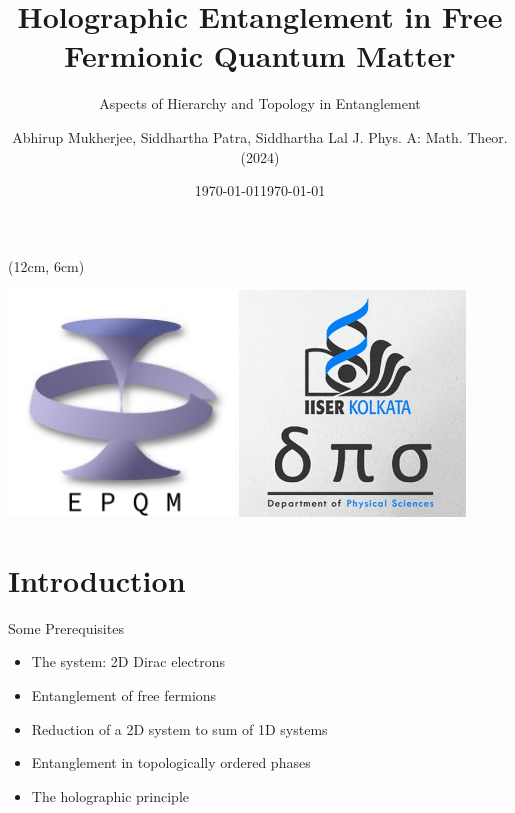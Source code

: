 \documentclass[12pt,aspectratio=169]{beamer}
\title{
	{Holographic Entanglement in Free Fermionic Quantum Matter}
}
\subtitle{Aspects of Hierarchy and Topology in Entanglement}
\date{\today}
\author{Abhirup Mukherjee, Siddhartha Patra, Siddhartha Lal \linebreak
\alert{J. Phys. A: Math. Theor. (2024)}}
\institute{Department of Physical Sciences, IISER Kolkata Mohanpur}
\date{\today}
\begin{document}
\centering
\begin{frame}
\maketitle
\begin{textblock*}{0.25\textwidth}(12cm, 6cm)
	\centering
	\vspace*{\fill}

	\includegraphics[width=0.45\textwidth]{figures/epqm_logo_mod.jpeg}
	\hspace*{\fill}
	\includegraphics[width=0.45\textwidth]{figures/dps_logo.jpeg}

	\vspace*{\fill}
\end{textblock*}
\end{frame}

\section{Introduction}

\begin{frame}{Some Prerequisites}
	\begin{itemize}
		\item The system: 2D Dirac electrons\\[10pt]
		\item Entanglement of free fermions\\[10pt]
		\item Reduction of a 2D system to sum of 1D systems\\[10pt]
		\item Entanglement in topologically ordered phases\\[10pt]
		\item The holographic principle
	\end{itemize}
\end{frame}
\end{document}
